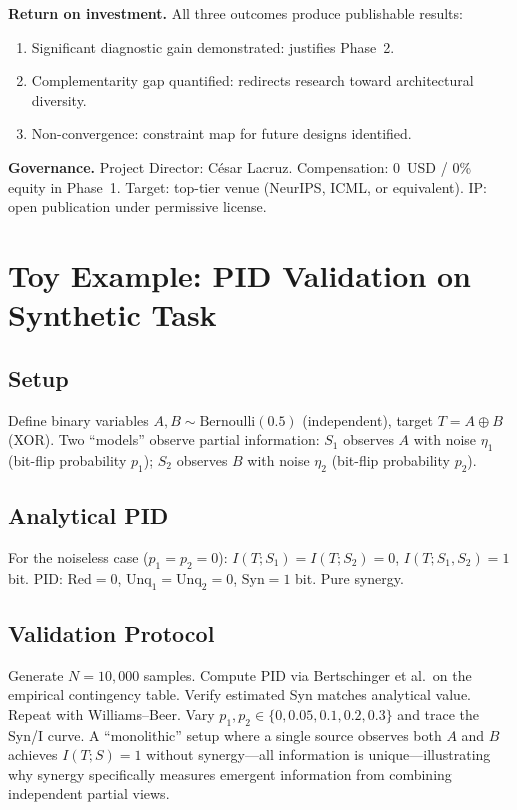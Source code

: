 \documentclass[11pt,a4paper]{article}
\theoremstyle{definition}
\begin{document}
\textbf{Return on investment.} All three outcomes produce publishable results:
\begin{enumerate}[leftmargin=*,itemsep=2pt]
\item Significant diagnostic gain demonstrated: justifies Phase~2.
\item Complementarity gap quantified: redirects research toward architectural diversity.
\item Non-convergence: constraint map for future designs identified.
\end{enumerate}

\textbf{Governance.} Project Director: C\'esar Lacruz. Compensation: 0~USD / 0\% equity in Phase~1. Target: top-tier venue (NeurIPS, ICML, or equivalent). IP: open publication under permissive license.


\section{Toy Example: PID Validation on Synthetic Task}
\label{app:toy}

\subsection{Setup}

Define binary variables $A, B \sim \text{Bernoulli}(0.5)$ (independent), target $T = A \oplus B$ (XOR). Two ``models'' observe partial information: $S_1$ observes $A$ with noise $\eta_1$ (bit-flip probability $p_1$); $S_2$ observes $B$ with noise $\eta_2$ (bit-flip probability $p_2$).

\subsection{Analytical PID}

For the noiseless case ($p_1 = p_2 = 0$): $I(T;S_1) = I(T;S_2) = 0$, $I(T;S_1,S_2) = 1$ bit. PID: $\mathrm{Red}=0$, $\mathrm{Unq}_1=\mathrm{Unq}_2=0$, $\mathrm{Syn}=1$ bit. Pure synergy.

\subsection{Validation Protocol}

Generate $N=10{,}000$ samples. Compute PID via Bertschinger et al.\ on the empirical contingency table. Verify estimated Syn matches analytical value. Repeat with Williams--Beer. Vary $p_1, p_2 \in \{0, 0.05, 0.1, 0.2, 0.3\}$ and trace the Syn/I curve. A ``monolithic'' setup where a single source observes both $A$ and $B$ achieves $I(T;S) = 1$ without synergy---all information is unique---illustrating why synergy specifically measures emergent information from combining independent partial views.
\end{document}
